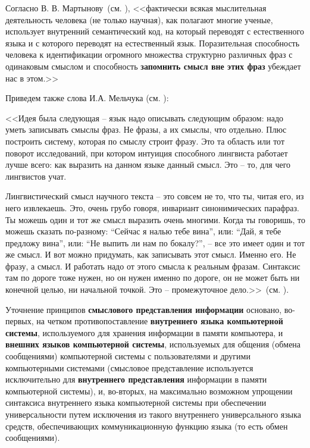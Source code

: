 Согласно В. В. Мартынову~(см. ), <<фактически всякая мыслительная деятельность человека (не только научная), как полагают многие ученые, использует внутренний семантический код, на который переводят с естественного языка и с которого переводят на естественный язык. Поразительная способность человека к идентификации огромного множества структурно различных фраз с одинаковым смыслом и способность \textbf{запомнить смысл вне этих фраз} убеждает нас в этом.>>

Приведем также слова И.А. Мельчука (см. ):

<<Идея была следующая -- язык надо описывать следующим образом: надо уметь записывать смыслы фраз. Не фразы, а их смыслы, что отдельно. Плюс построить систему, которая по смыслу строит фразу. Это та область или тот поворот исследований, при котором интуиция способного лингвиста работает лучше всего: как выразить на данном языке данный смысл. Это -- то, для чего лингвистов учат.

Лингвистический смысл научного текста -- это совсем не то, что ты, читая его, из него извлекаешь. Это, очень грубо говоря, инвариант синонимических парафраз. Ты можешь один и тот же смысл выразить очень многими. Когда ты говоришь, то можешь сказать по-разному: ``Сейчас я налью тебе вина'', или: ``Дай, я тебе предложу вина'', или: ``Не выпить ли нам по бокалу?'', -- все это имеет один и тот же смысл. И вот можно придумать, как записывать этот смысл. Именно его. Не фразу, а смысл. И работать надо от этого смысла к реальным фразам. Синтаксис там по дороге тоже нужен, но он нужен именно по дороге, он не может быть ни конечной целью, ни начальной точкой. Это -- промежуточное дело.>>~(см. ).

Уточнение принципов \textbf{смыслового представления информации} основано, во-первых, на четком противопоставление \textbf{внутреннего языка компьютерной системы}, используемого для хранения информации в памяти компьютера, и \textbf{внешних языков компьютерной системы}, используемых для общения (обмена сообщениями) компьютерной системы с пользователями и другими компьютерными системами (смысловое представление используется исключительно для \textbf{внутреннего представления} информации в памяти компьютерной системы), и, во-вторых, на максимально возможном упрощении синтаксиса внутреннего языка компьютерной системы при обеспечении универсальности  путем исключения из такого внутреннего универсального языка средств, обеспечивающих коммуникационную функцию языка (то есть обмен сообщениями).

